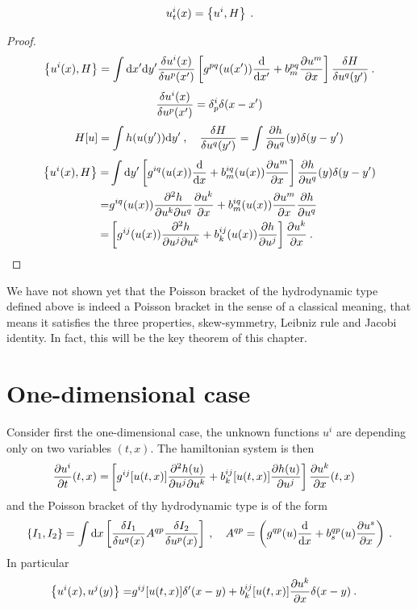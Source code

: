 \begin{proposition}
    \begin{align}
        u^i_t(x) = \left \lbrace u^i,H \right \rbrace \:.
    \end{align}
\end{proposition}
\begin{proof}
    \begin{align}
        \left \lbrace u^i(x),H \right \rbrace = \int \mathrm{d} x' \mathrm{d} y' \frac{\delta u^i(x)}{\delta u^p(x')} \left[ g^{pq}(u(x')) \frac{\mathrm{d}}{\mathrm{d}x'} + b^{pq}_m \frac{\partial u^m}{\partial x} \right] \frac{\delta H}{\delta u^q(y')} \:.
    \end{align}
    \begin{align}
        \frac{\delta u^i(x)}{\delta u^p(x')} = \delta^i_p \delta(x-x')
    \end{align}
    \begin{align}
        H[u] = \int h(u(y')) \mathrm{d} y' \:, \quad \frac{\delta H}{\delta u^q(y')} = \int \frac{\partial h}{\partial u^q}(y) \delta(y-y')
    \end{align}
    \begin{align}
        \left \lbrace u^i(x),H \right \rbrace =& \int \mathrm{d} y' \left[ g^{iq}(u(x)) \frac{\mathrm{d}}{\mathrm{d}x} + b^{iq}_m(u(x)) \frac{\partial u^m}{\partial x} \right] \frac{\partial h}{\partial u^q}(y) \delta(y-y') 
        \\ =& g^{iq}(u(x)) \frac{\partial ^2 h}{\partial u^k \partial u^q} \frac{\partial u^k}{\partial x} + b^{iq}_m(u(x)) \frac{\partial u^m}{\partial x} \frac{\partial h}{\partial u^q}
        \\ =& \left[ g^{ij}(u(x)) \frac{\partial ^2 h}{\partial u^j \partial u^k}  + b^{ij}_k(u(x))  \frac{\partial h}{\partial u^j} \right] \frac{\partial u^k}{\partial x} \:.
    \end{align}
\end{proof}


We have not shown yet that the Poisson bracket of the hydrodynamic type defined above is indeed a Poisson bracket in the sense of a classical meaning, that means it satisfies the three properties, skew-symmetry, Leibniz rule and Jacobi identity. In fact, this will be the key theorem of this chapter.

\section{One-dimensional case}

Consider first the one-dimensional case, the unknown functions $u^i$ are depending only on two variables $(t,x)$. The hamiltonian system is then
\begin{align}
    \frac{\partial u^i}{\partial t} (t,x) =&
    \left[ g^{ij} [u(t,x)] \frac{\partial^2 h(u)}{\partial u^j \partial u^k} + b_k^{ij} [u(t,x)] \frac{\partial h(u)}{\partial u^j} \right] \frac{\partial u^k}{\partial x}(t,x) 
\end{align}
and the Poisson bracket of thy hydrodynamic type is of the form
\begin{align}
    \left \lbrace I_1,I_2 \right \rbrace = \int \mathrm{d} x
    \left[ \frac{\delta I_1}{\delta u^q(x)} A^{qp} \frac{\delta I_2}{\delta u^p(x)} \right] \:, \quad A^{qp} = \left( g^{qp}(u) \frac{\mathrm{d}}{\mathrm{d}x} + b^{qp}_s(u) \frac{\partial u^s}{\partial x} \right) \:.
\end{align}
In particular
\begin{align}
    \label{eq:Poisson1D}
    \left \lbrace u^i(x), u^j(y) \right \rbrace =& g^{ij} [u(t,x)] \delta'(x-y) + b_k^{ij} [u(t,x)] \frac{\partial u^k}{\partial x} \delta(x-y) \:. 
\end{align}

